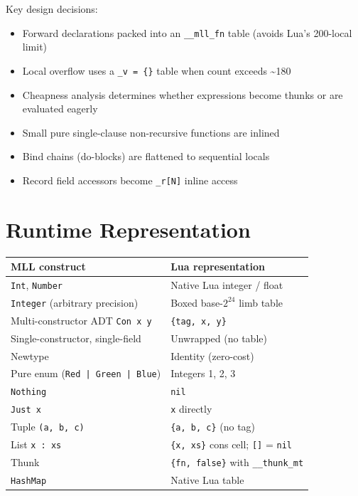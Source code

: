 \documentclass[11pt,a4paper]{article}
\begin{document}
Key design decisions:
\begin{itemize}[nosep]
  \item Forward declarations packed into an \texttt{\_\_mll\_fn} table (avoids
        Lua's 200-local limit)
  \item Local overflow uses a \texttt{\_v = \{\}} table when count exceeds
        \textasciitilde180
  \item Cheapness analysis determines whether expressions become thunks or
        are evaluated eagerly
  \item Small pure single-clause non-recursive functions are inlined
  \item Bind chains (do-blocks) are flattened to sequential locals
  \item Record field accessors become \texttt{\_r[N]} inline access
\end{itemize}

\section{Runtime Representation}

\begin{tabular}{@{}ll@{}}
\toprule
\textbf{MLL construct} & \textbf{Lua representation} \\
\midrule
\texttt{Int}, \texttt{Number}                & Native Lua integer / float \\
\texttt{Integer} (arbitrary precision)  & Boxed base-\(2^{24}\) limb table \\
Multi-constructor ADT \texttt{Con x y}  & \texttt{\{tag, x, y\}} \\
Single-constructor, single-field        & Unwrapped (no table) \\
Newtype                                 & Identity (zero-cost) \\
Pure enum (\texttt{Red | Green | Blue}) & Integers 1, 2, 3 \\
\texttt{Nothing}                        & \texttt{nil} \\
\texttt{Just x}                         & \texttt{x} directly \\
Tuple \texttt{(a, b, c)}                & \texttt{\{a, b, c\}} (no tag) \\
List \texttt{x : xs}                    & \texttt{\{x, xs\}} cons cell; \texttt{[]} = \texttt{nil} \\
Thunk                                   & \texttt{\{fn, false\}} with \texttt{\_\_thunk\_mt} \\
\texttt{HashMap}                        & Native Lua table \\
\bottomrule
\end{tabular}
\end{document}
